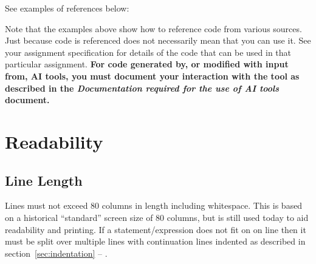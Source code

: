 \documentclass{article}
\newcommand{\icon}[1]{\raisebox{-3pt}{\texttt{[image: icons/\#1.png]}}}
\begin{document}
See examples of references below:

\nolinenumbers
{}

\linenumbers

\nolinenumbers
{}

\linenumbers
 
\nolinenumbers
{}

\linenumbers

\nolinenumbers
{}

\linenumbers

\nolinenumbers
{}

\linenumbers

Note that the examples above show how to reference code from various sources. Just because code is referenced
does not necessarily mean that you can use it. See your assignment specification for details of the code that can
be used in that particular assignment. \textbf{For code generated by, or modified with input from, AI tools, you must
document your interaction with the tool as described in the \textit{Documentation required for the use of AI tools} document.}

\section{Readability}

\subsection{Line Length \protect\hfill\icon{CLANG-FORMAT}}
Lines must not exceed 80 columns in length including whitespace.
This is based on a historical ``standard'' screen size of 80 columns, but is still used today to aid readability and printing.
If a statement/expression does not fit on on line then it must be split over multiple lines with continuation lines indented
as described in section~\ref{sec:indentation} -- .
\end{document}

